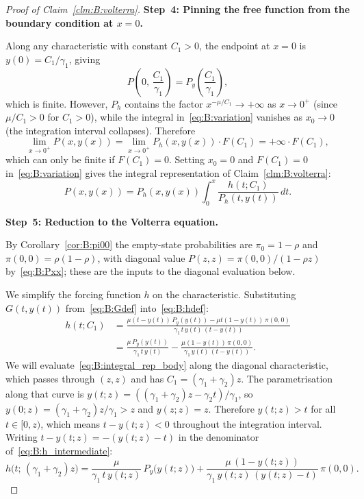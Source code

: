 \begin{proof}[Proof of Claim~\ref{clm:B:volterra}]
\medskip\noindent\textbf{Step~4: Pinning the free function from the boundary condition at $x=0$.}

Along any characteristic with constant $C_1>0$, the endpoint at $x=0$ is
$y(0)=C_1/\gamma_1$, giving
\[
    P\!\left(0,\,\frac{C_1}{\gamma_1}\right) = P_y\!\left(\frac{C_1}{\gamma_1}\right),
\]
which is finite.  However, $P_h$ contains the factor
$x^{-\mu/C_1}\to+\infty$ as $x\to0^+$ (since $\mu/C_1>0$ for $C_1>0$), while
the integral in~\eqref{eq:B:variation} vanishes as $x_0\to0$ (the integration
interval collapses).  Therefore
\[
    \lim_{x\to0^+}P(x,y(x))
    = \lim_{x\to0^+}P_h(x,y(x))\cdot F(C_1)
    = +\infty\cdot F(C_1),
\]
which can only be finite if $F(C_1)=0$.  Setting $x_0=0$ and $F(C_1)=0$
in~\eqref{eq:B:variation} gives the integral representation of
Claim~\ref{clm:B:volterra}:
\begin{equation}
    P(x,y(x)) = P_h(x,y(x))\int_{0}^{x} \frac{h(t;C_1)}{P_h(t,y(t))}\,dt.
    \label{eq:B:integral_rep_body}
\end{equation}

\medskip\noindent\textbf{Step~5: Reduction to the Volterra equation.}

By Corollary~\ref{cor:B:pi00} the empty-state probabilities are $\pi_0=1-\rho$ and
$\pi(0,0)=\rho(1-\rho)$, with diagonal value $P(z,z)=\pi(0,0)/(1-\rho z)$
by~\eqref{eq:B:Pxx}; these are the inputs to the diagonal evaluation below.

We simplify the forcing function $h$ on the characteristic.  Substituting
$G(t,y(t))$ from~\eqref{eq:B:Gdef} into~\eqref{eq:B:hdef}:
\begin{align}
    h(t;C_1)
    &= \frac{\mu(t-y(t))\,P_y(y(t)) - \mu t(1-y(t))\,\pi(0,0)}
             {\gamma_1\,t\,y(t)\,(t-y(t))} \nonumber\\
    &= \frac{\mu\,P_y(y(t))}{\gamma_1\,t\,y(t)}
       - \frac{\mu(1-y(t))\,\pi(0,0)}{\gamma_1\,y(t)\,(t-y(t))}.
    \label{eq:B:h_intermediate}
\end{align}
We will evaluate~\eqref{eq:B:integral_rep_body} along the diagonal characteristic,
which passes through $(z,z)$ and has $C_1=(\gamma_1+\gamma_2)z$.  The parametrisation
along that curve is $y(t;z)=((\gamma_1+\gamma_2)z-\gamma_2 t)/\gamma_1$, so
$y(0;z)=(\gamma_1+\gamma_2)z/\gamma_1>z$ and $y(z;z)=z$.  Therefore $y(t;z)>t$
for all $t\in[0,z)$, which means $t-y(t;z)<0$ throughout the integration interval.
Writing $t-y(t;z)=-(y(t;z)-t)$ in the denominator of~\eqref{eq:B:h_intermediate}:
\begin{equation}
    h\bigl(t;\,(\gamma_1+\gamma_2)z\bigr)
    = \frac{\mu}{\gamma_1\,t\,y(t;z)}\,P_y\!\bigl(y(t;z)\bigr)
    + \frac{\mu\,(1-y(t;z))}{\gamma_1\,y(t;z)\,(y(t;z)-t)}\,\pi(0,0).
    \label{eq:B:h_simplified}
\end{equation}


\end{proof}

